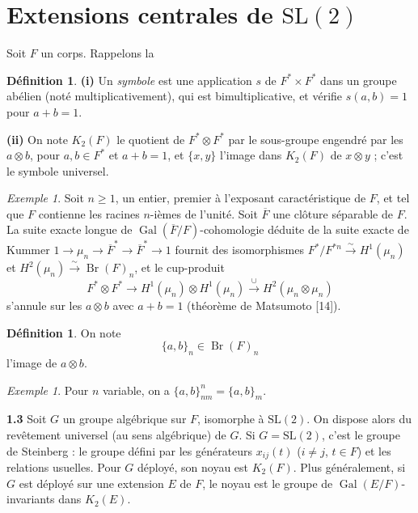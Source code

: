 \documentclass[12pt,a4paper]{article}
\theoremstyle{plain}
\theoremstyle{definition}
\newtheorem{definition}[theorem]{Définition}
\theoremstyle{remark}
\newtheorem{example}[theorem]{Exemple}
\DeclareMathOperator{\Br}{Br}
\newcommand{\ov}[1]{\overline{#1}}
\DeclareMathOperator{\Gal}{Gal}
\providecommand{\Gal}{\operatorname{Gal}}
\begin{document}
\section{Extensions centrales de $\mathrm{SL}(2)$}

Soit $F$ un corps. Rappelons la

\begin{definition}
\textbf{(i)} Un \emph{symbole} est une application $s$ de $F^* \times F^*$ dans un groupe abélien (noté multiplicativement), qui est bimultiplicative, et vérifie $s(a, b) = 1$ pour $a + b = 1$.

\textbf{(ii)} On note $K_2(F)$ le quotient de $F^* \otimes F^*$ par le sous-groupe engendré par les $a \otimes b$, pour $a, b \in F^*$ et $a + b = 1$, et $\{x, y\}$ l'image dans $K_2(F)$ de $x \otimes y$ ; c'est le symbole universel.
\end{definition}

\begin{example}
Soit $n \geq 1$, un entier, premier à l'exposant caractéristique de $F$, et tel que $F$ contienne les racines $n$-ièmes de l'unité. Soit $\ov{F}$ une clôture séparable de $F$. La suite exacte longue de $\Gal(\ov{F}/F)$-cohomologie déduite de la suite exacte de Kummer $1 \to \mu_n \to \ov{F}^* \to \ov{F}^* \to 1$ fournit des isomorphismes $F^*/F^{*n} \xrightarrow{\sim} H^1(\mu_n)$ et $H^2(\mu_n) \xrightarrow{\sim} \Br(F)_n$, et le cup-produit
\[
F^* \otimes F^* \longrightarrow H^1(\mu_n) \otimes H^1(\mu_n) \xrightarrow{\ \cup\ } H^2(\mu_n \otimes \mu_n)
\]
s'annule sur les $a \otimes b$ avec $a + b = 1$ (théorème de Matsumoto [14]).
\end{example}

\begin{definition}
On note
\[
\{a, b\}_n \in \Br(F)_n
\]
l'image de $a \otimes b$.
\end{definition}

\begin{example}
Pour $n$ variable, on a $\{a, b\}_{nm}^n = \{a, b\}_m$.
\end{example}

\textbf{1.3} Soit $G$ un groupe algébrique sur $F$, isomorphe à $\mathrm{SL}(2)$. On dispose alors du revêtement universel (au sens algébrique) de $G$. Si $G = \mathrm{SL}(2)$, c'est le groupe de Steinberg : le groupe défini par les générateurs $x_{ij}(t)$ ($i \neq j$, $t \in F$) et les relations usuelles. Pour $G$ déployé, son noyau est $K_2(F)$. Plus généralement, si $G$ est déployé sur une extension $E$ de $F$, le noyau est le groupe de $\Gal(E/F)$-invariants dans $K_2(E)$.
\end{document}
